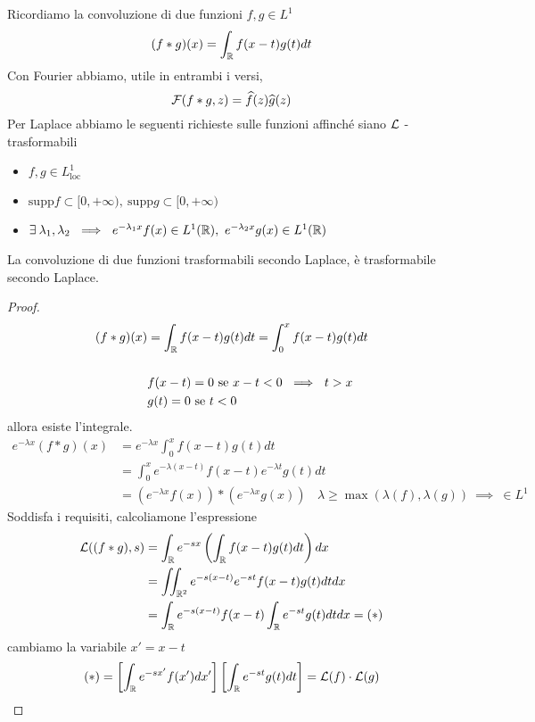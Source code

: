 Ricordiamo la convoluzione di due funzioni $f, g\in L^{1}$
\begin{equation*}
(f*g)(x) = \int_{\mathbb{R}} f(x - t) g(t) dt
\end{equation*}
Con Fourier abbiamo, utile in entrambi i versi,
\begin{equation*}
\mathcal{F}(f*g, z) = \widehat{f}(z)\widehat{g}(z)
\end{equation*}
Per Laplace abbiamo le seguenti richieste sulle funzioni affinché siano $\mathcal{L}$ - trasformabili
\begin{itemize}
\item $f, g\in L^{1}_{\mathrm{loc}}$
\item $\mathrm{supp} f\subset [0, + \infty), \ \mathrm{supp} g\subset [0, + \infty)$
\item $\exists \lambda_{1}, \lambda_{2} \ \implies \ e^{- \lambda_{1} x} f(x) \in L^{1}(\RR), \ e^{- \lambda_{2} x} g(x) \in L^{1}(\RR)$
\end{itemize}
\begin{thm}
La convoluzione di due funzioni trasformabili secondo Laplace, è trasformabile secondo Laplace.
\end{thm}
\begin{proof}
\begin{equation*}
\begin{aligned}
(f*g)(x) & = \int_{\mathbb{R}} f(x - t) g(t) dt = \int^{x}_{0} f(x - t) g(t) dt\\
 & \\
 & f(x - t) = 0\ \text{se} \ x - t < 0\ \implies \ t > x\\
 & g(t) = 0\ \text{se} \ t < 0
\end{aligned}
\end{equation*}
allora esiste l'integrale.
\begin{equation*}
\begin{aligned}
e^{- \lambda x}(f*g)(x) & = e^{- \lambda x}\int^{x}_{0} f(x - t) g(t) dt\\
 & = \int^{x}_{0} e^{- \lambda (x - t)} f(x - t) e^{- \lambda t} g(t) dt\\
 & = \left(e^{- \lambda x} f(x)\right) *\left(e^{- \lambda x} g(x)\right) \ \ \ \ \lambda \geq \max(\lambda (f), \lambda (g)) \ \implies \ \in L^{1}
\end{aligned}
\end{equation*}
Soddisfa i requisiti, calcoliamone l'espressione
\begin{align*}
\mathcal{L}((f*g), s) & = \int_{\mathbb{R}} e^{- sx}\left(\int_{\mathbb{R}} f(x - t) g(t) dt\right) dx\\
 & = \iint_{\mathbb{R}^{2}} e^{- s(x - t)} e^{- st} f(x - t) g(t) dtdx\\
 & = \int_{\mathbb{R}} e^{- s(x - t)} f(x - t)\int_{\mathbb{R}} e^{- st} g(t) dtdx = (*)
\end{align*}
cambiamo la variabile $x'= x - t$
\begin{gather*}
(*) = \left[\int_{\mathbb{R}} e^{- sx'} f(x') dx'\right]\left[\int_{\mathbb{R}} e^{- st} g(t) dt\right] = \mathcal{L}(f) \cdot \mathcal{L}(g)
\end{gather*}
\end{proof}

